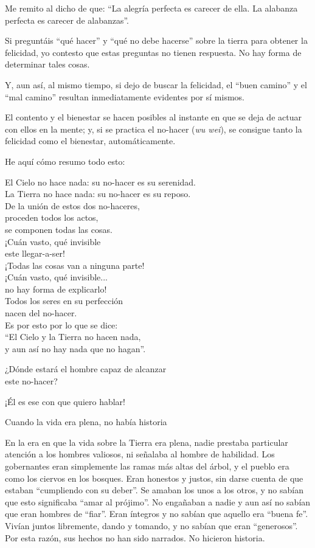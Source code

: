 \documentclass[hidelinks]{memoir}
\begin{document}
	Me remito al dicho de que: ``La alegría perfecta es carecer de ella. La
	alabanza perfecta es carecer de alabanzas''.
	
	Si preguntáis ``qué hacer'' y ``qué no debe hacerse'' sobre la tierra
	para obtener la felicidad, yo contesto que estas preguntas no tienen
	respuesta. No hay forma de determinar tales cosas.
	
	Y, aun así, al mismo tiempo, si dejo de buscar la felicidad, el ``buen
	camino'' y el ``mal camino'' resultan inmediatamente evidentes por sí
	mismos.
	
	El contento y el bienestar se hacen posibles al instante en que se deja
	de actuar con ellos en la mente; y, si se practica el no-hacer (\textit{wu
		wei}), se consigue tanto la felicidad como el bienestar,
	automáticamente.
	
	He aquí cómo resumo todo esto:
	
	El Cielo no hace nada: su no-hacer es su serenidad.\\
	La Tierra no hace nada: su no-hacer es su reposo.\\
	De la unión de estos dos no-haceres,\\
	proceden todos los actos,\\
	se componen todas las cosas.\\
	¡Cuán vasto, qué invisible\\
	este llegar-a-ser!\\
	¡Todas las cosas van a ninguna parte!\\
	¡Cuán vasto, qué invisible...\\
	no hay forma de explicarlo!\\
	Todos los seres en su perfección\\
	nacen del no-hacer.\\
	Es por esto por lo que se dice:\\
	``El Cielo y la Tierra no hacen nada,\\
	y aun así no hay nada que no hagan''.
	
	¿Dónde estará el hombre capaz de alcanzar\\
	este no-hacer?
	
	¡Él es ese con que quiero hablar!
	
	Cuando la vida era plena, no había historia
	
	En la era en que la vida sobre la Tierra era plena, nadie prestaba
	particular atención a los hombres valiosos, ni señalaba al hombre de
	habilidad. Los gobernantes eran simplemente las ramas más altas del
	árbol, y el pueblo era como los ciervos en los bosques. Eran honestos y
	justos, sin darse cuenta de que estaban ``cumpliendo con su deber''. Se
	amaban los unos a los otros, y no sabían que esto significaba ``amar al
	prójimo''. No engañaban a nadie y aun así no sabían que eran hombres de
	``fiar''. Eran íntegros y no sabían que aquello era ``buena fe''. Vivían
	juntos libremente, dando y tomando, y no sabían que eran ``generosos''.
	Por esta razón, sus hechos no han sido narrados. No hicieron historia.
	
\end{document}
